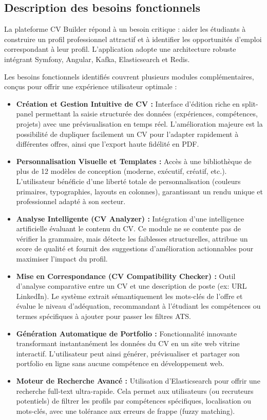 \documentclass[12pt,a4paper]{report}
\begin{document}
	\subsection{Description des besoins fonctionnels}
	La plateforme CV Builder répond à un besoin critique : aider les étudiants à construire un profil professionnel attractif et à identifier les opportunités d'emploi correspondant à leur profil. L'application adopte une architecture robuste intégrant Symfony, Angular, Kafka, Elasticsearch et Redis.
	
	Les besoins fonctionnels identifiés couvrent plusieurs modules complémentaires, conçus pour offrir une expérience utilisateur optimale :
	\begin{itemize}
		\item \textbf{Création et Gestion Intuitive de CV :} Interface d'édition riche en split-panel permettant la saisie structurée des données (expériences, compétences, projets) avec une prévisualisation en temps réel. L'amélioration majeure est la possibilité de dupliquer facilement un CV pour l'adapter rapidement à différentes offres, ainsi que l'export haute fidélité en PDF.
		\item \textbf{Personnalisation Visuelle et Templates :} Accès à une bibliothèque de plus de 12 modèles de conception (moderne, exécutif, créatif, etc.). L'utilisateur bénéficie d'une liberté totale de personnalisation (couleurs primaires, typographies, layouts en colonnes), garantissant un rendu unique et professionnel adapté à son secteur.
		\item \textbf{Analyse Intelligente (CV Analyzer) :} Intégration d'une intelligence artificielle évaluant le contenu du CV. Ce module ne se contente pas de vérifier la grammaire, mais détecte les faiblesses structurelles, attribue un score de qualité et fournit des suggestions d'amélioration actionnables pour maximiser l'impact du profil.
		\item \textbf{Mise en Correspondance (CV Compatibility Checker) :} Outil d'analyse comparative entre un CV et une description de poste (ex: URL LinkedIn). Le système extrait sémantiquement les mots-clés de l'offre et évalue le niveau d'adéquation, recommandant à l'étudiant les compétences ou termes spécifiques à ajouter pour passer les filtres ATS.
		\item \textbf{Génération Automatique de Portfolio :} Fonctionnalité innovante transformant instantanément les données du CV en un site web vitrine interactif. L'utilisateur peut ainsi générer, prévisualiser et partager son portfolio en ligne sans aucune compétence en développement web.
		\item \textbf{Moteur de Recherche Avancé :} Utilisation d'Elasticsearch pour offrir une recherche full-text ultra-rapide. Cela permet aux utilisateurs (ou recruteurs potentiels) de filtrer les profils par compétences spécifiques, localisation ou mots-clés, avec une tolérance aux erreurs de frappe (fuzzy matching).
	\end{itemize}
	
\end{document}

